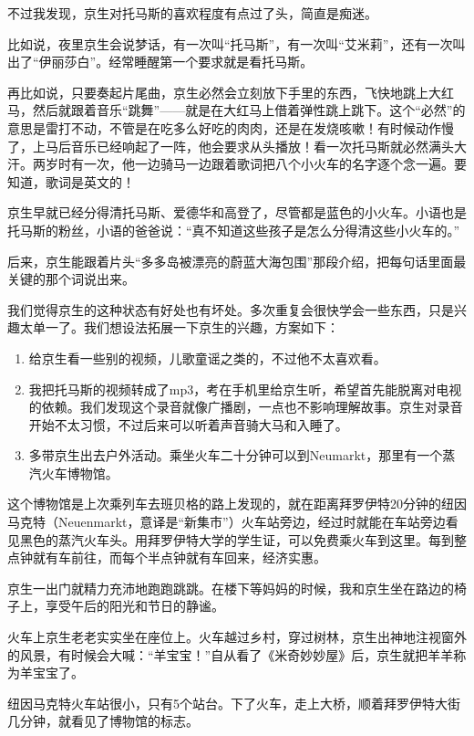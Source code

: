 \documentclass[twoside,openright,headings=optiontohead]{ctexbook} %
\begin{document}
{不过我发现，京生对托马斯的喜欢程度有点过了头，简直是痴迷。

比如说，夜里京生会说梦话，有一次叫``托马斯''，有一次叫``艾米莉''，还有一次叫出了``伊丽莎白''。经常睡醒第一个要求就是看托马斯。

再比如说，只要奏起片尾曲，京生必然会立刻放下手里的东西，飞快地跳上大红马，然后就跟着音乐``跳舞''------就是在大红马上借着弹性跳上跳下。这个``必然''的意思是雷打不动，不管是在吃多么好吃的肉肉，还是在发烧咳嗽！有时候动作慢了，上马后音乐已经响起了一阵，他会要求从头播放！看一次托马斯就必然满头大汗。两岁时有一次，他一边骑马一边跟着歌词把八个小火车的名字逐个念一遍。要知道，歌词是英文的！

京生早就已经分得清托马斯、爱德华和高登了，尽管都是蓝色的小火车。小语也是托马斯的粉丝，小语的爸爸说：``真不知道这些孩子是怎么分得清这些小火车的。''

后来，京生能跟着片头``多多岛被漂亮的蔚蓝大海包围''那段介绍，把每句话里面最关键的那个词说出来。

我们觉得京生的这种状态有好处也有坏处。多次重复会很快学会一些东西，只是兴趣太单一了。我们想设法拓展一下京生的兴趣，方案如下：

\begin{enumerate}
\def\labelenumi{\arabic{enumi}.}
\item
  给京生看一些别的视频，儿歌童谣之类的，不过他不太喜欢看。
\item
  我把托马斯的视频转成了mp3，考在手机里给京生听，希望首先能脱离对电视的依赖。我们发现这个录音就像广播剧，一点也不影响理解故事。京生对录音开始不太习惯，不过后来可以听着声音骑大马和入睡了。
\item
  多带京生出去户外活动。乘坐火车二十分钟可以到Neumarkt，那里有一个蒸汽火车博物馆。
\end{enumerate}

这个博物馆是上次乘列车去班贝格的路上发现的，就在距离拜罗伊特20分钟的纽因马克特（Neuenmarkt，意译是``新集市''）火车站旁边，经过时就能在车站旁边看见黑色的蒸汽火车头。用拜罗伊特大学的学生证，可以免费乘火车到这里。每到整点钟就有车前往，而每个半点钟就有车回来，经济实惠。

京生一出门就精力充沛地跑跑跳跳。在楼下等妈妈的时候，我和京生坐在路边的椅子上，享受午后的阳光和节日的静谧。

火车上京生老老实实坐在座位上。火车越过乡村，穿过树林，京生出神地注视窗外的风景，有时候会大喊：``羊宝宝！''自从看了《米奇妙妙屋》后，京生就把羊羊称为羊宝宝了。

纽因马克特火车站很小，只有5个站台。下了火车，走上大桥，顺着拜罗伊特大街几分钟，就看见了博物馆的标志。

}
\end{document}
